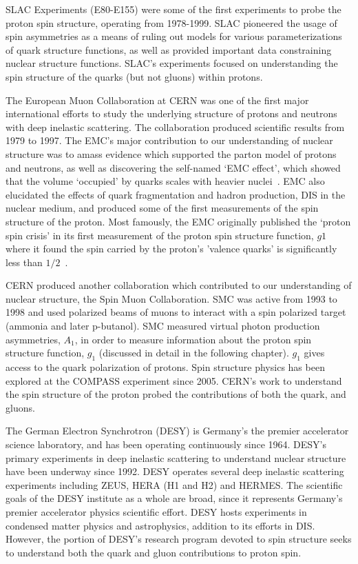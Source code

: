 SLAC Experiments (E80-E155) were some of the first experiments to probe the
proton spin structure, operating from 1978-1999. SLAC pioneered the usage of
spin asymmetries as a means of ruling out models for various parameterizations
of quark structure functions, as well as provided important data constraining
nuclear structure functions. SLAC's experiments focused on understanding the
spin structure of the quarks (but not gluons) within protons.

The European Muon Collaboration at CERN was one of the first major international
efforts to study the underlying structure of protons and neutrons with deep
inelastic scattering. The collaboration produced scientific results from 1979 to
1997. The EMC's major contribution to our understanding of nuclear structure was
to amass evidence which supported the parton model of protons and neutrons, as
well as discovering the self-named `EMC effect', which showed that the volume
`occupied' by quarks scales with heavier nuclei~\cite{Aubert1983}. EMC also
elucidated the effects of quark fragmentation and hadron production, DIS in the
nuclear medium, and produced some of the first measurements of the spin
structure of the proton. Most famously, the EMC originally published the `proton
spin crisis' in its first measurement of the proton spin structure function,
$g1$ where it found the spin carried by the proton's 'valence quarks' is
significantly less than $1/2$~\cite{Ashman1988}. 

CERN produced another collaboration which contributed to our understanding of
nuclear structure, the Spin Muon Collaboration. SMC was active from 1993 to 1998
and used polarized beams of muons to interact with a spin polarized target
(ammonia and later p-butanol). SMC measured virtual photon production
asymmetries, $A_1$, in order to measure information about the proton spin
structure function, $g_1$ (discussed in detail in the following chapter). $g_1$
gives access to the quark polarization of protons. Spin structure physics has
been explored at the COMPASS experiment since 2005. CERN's work to understand
the spin structure of the proton probed the contributions of both the quark, and
gluons. 

The German Electron Synchrotron (DESY) is Germany's the premier accelerator
science laboratory, and has been operating continuously since 1964. DESY's
primary experiments in deep inelastic scattering to understand nuclear structure
have been underway since 1992. DESY operates several deep inelastic scattering
experiments including ZEUS, HERA (H1 and H2) and HERMES.  The scientific goals
of the DESY institute as a whole are broad, since it represents Germany's
premier accelerator physics scientific effort. DESY hosts experiments in
condensed matter physics and astrophysics, addition to its efforts in DIS.
However, the portion of DESY's research program devoted to spin structure seeks
to understand both the quark and gluon contributions to proton spin.

